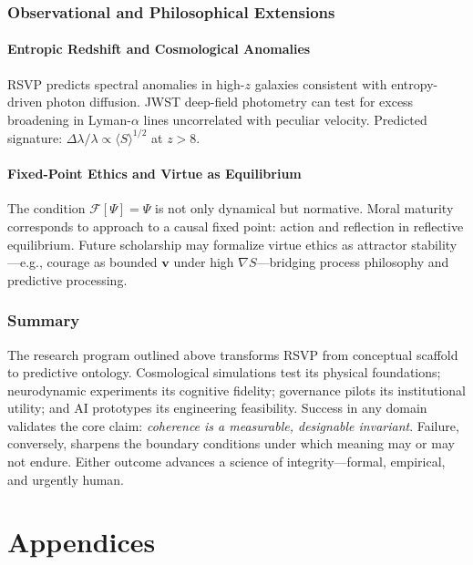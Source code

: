 \documentclass[12pt,a4paper]{article}
\begin{document}
\section{Observational and Philosophical Extensions}
\subsection{Entropic Redshift and Cosmological Anomalies}
RSVP predicts spectral anomalies in high-$z$ galaxies consistent with entropy-driven photon diffusion. JWST deep-field photometry can test for excess broadening in Lyman-$\alpha$ lines uncorrelated with peculiar velocity. Predicted signature: $\Delta\lambda / \lambda \propto \langle S \rangle^{1/2}$ at $z > 8$.

\subsection{Fixed-Point Ethics and Virtue as Equilibrium}
The condition $\mathcal{F}[\Psi] = \Psi$ is not only dynamical but normative. Moral maturity corresponds to approach to a causal fixed point: action and reflection in reflective equilibrium. Future scholarship may formalize virtue ethics as attractor stability—e.g., courage as bounded $\bm{v}$ under high $\nabla S$—bridging process philosophy \cite{whitehead1929process} and predictive processing.

\section*{Summary}
The research program outlined above transforms RSVP from conceptual scaffold to predictive ontology. Cosmological simulations test its physical foundations; neurodynamic experiments its cognitive fidelity; governance pilots its institutional utility; and AI prototypes its engineering feasibility. Success in any domain validates the core claim: \emph{coherence is a measurable, designable invariant}. Failure, conversely, sharpens the boundary conditions under which meaning may or may not endure. Either outcome advances a science of integrity—formal, empirical, and urgently human.

\clearpage
\appendix
\part{Appendices}
\end{document}
